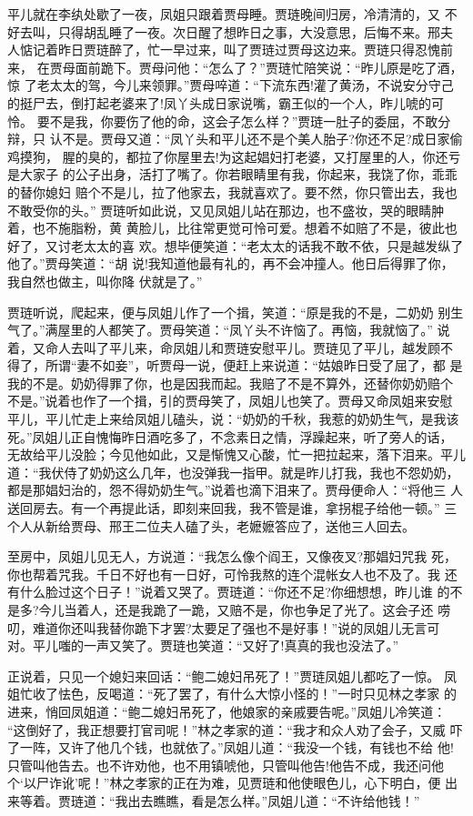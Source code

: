 平儿就在李纨处歇了一夜，凤姐只跟着贾母睡。贾琏晚间归房，冷清清的，又
不好去叫，只得胡乱睡了一夜。次日醒了想昨日之事，大没意思，后悔不来。邢夫
人惦记着昨日贾琏醉了，忙一早过来，叫了贾琏过贾母这边来。贾琏只得忍愧前来，
在贾母面前跪下。贾母问他：“怎么了？”贾琏忙陪笑说：“昨儿原是吃了酒，惊
了老太太的驾，今儿来领罪。”贾母啐道：“下流东西!灌了黄汤，不说安分守己
的挺尸去，倒打起老婆来了!凤丫头成日家说嘴，霸王似的一个人，昨儿唬的可怜。
要不是我，你要伤了他的命，这会子怎么样？”贾琏一肚子的委屈，不敢分辩，只
认不是。贾母又道：“凤丫头和平儿还不是个美人胎子?你还不足?成日家偷鸡摸狗，
腥的臭的，都拉了你屋里去!为这起娼妇打老婆，又打屋里的人，你还亏是大家子
的公子出身，活打了嘴了。你若眼睛里有我，你起来，我饶了你，乖乖的替你媳妇
赔个不是儿，拉了他家去，我就喜欢了。要不然，你只管出去，我也不敢受你的头。”
贾琏听如此说，又见凤姐儿站在那边，也不盛妆，哭的眼睛肿着，也不施脂粉，黄
黄脸儿，比往常更觉可怜可爱。想着不如赔了不是，彼此也好了，又讨老太太的喜
欢。想毕便笑道：“老太太的话我不敢不依，只是越发纵了他了。”贾母笑道：“胡
说!我知道他最有礼的，再不会冲撞人。他日后得罪了你，我自然也做主，叫你降
伏就是了。”

贾琏听说，爬起来，便与凤姐儿作了一个揖，笑道：“原是我的不是，二奶奶
别生气了。”满屋里的人都笑了。贾母笑道：“凤丫头不许恼了。再恼，我就恼了。”
说着，又命人去叫了平儿来，命凤姐儿和贾琏安慰平儿。贾琏见了平儿，越发顾不
得了，所谓“妻不如妾”，听贾母一说，便赶上来说道：“姑娘昨日受了屈了，都
是我的不是。奶奶得罪了你，也是因我而起。我赔了不是不算外，还替你奶奶赔个
不是。”说着也作了一个揖，引的贾母笑了，凤姐儿也笑了。贾母又命凤姐来安慰
平儿，平儿忙走上来给凤姐儿磕头，说：“奶奶的千秋，我惹的奶奶生气，是我该
死。”凤姐儿正自愧悔昨日酒吃多了，不念素日之情，浮躁起来，听了旁人的话，
无故给平儿没脸；今见他如此，又是惭愧又心酸，忙一把拉起来，落下泪来。平儿
道：“我伏侍了奶奶这么几年，也没弹我一指甲。就是昨儿打我，我也不怨奶奶，
都是那娼妇治的，怨不得奶奶生气。”说着也滴下泪来了。贾母便命人：“将他三
人送回房去。有一个再提此话，即刻来回我，我不管是谁，拿拐棍子给他一顿。”
三个人从新给贾母、邢王二位夫人磕了头，老嬷嬷答应了，送他三人回去。

至房中，凤姐儿见无人，方说道：“我怎么像个阎王，又像夜叉?那娼妇咒我
死，你也帮着咒我。千日不好也有一日好，可怜我熬的连个混帐女人也不及了。我
还有什么脸过这个日子！”说着又哭了。贾琏道：“你还不足?你细想想，昨儿谁
的不是多?今儿当着人，还是我跪了一跪，又赔不是，你也争足了光了。这会子还
唠叨，难道你还叫我替你跪下才罢?太要足了强也不是好事！”说的凤姐儿无言可
对。平儿嗤的一声又笑了。贾琏也笑道：“又好了!真真的我也没法了。”

正说着，只见一个媳妇来回话：“鲍二媳妇吊死了！”贾琏凤姐儿都吃了一惊。
凤姐忙收了怯色，反喝道：“死了罢了，有什么大惊小怪的！”一时只见林之孝家
的进来，悄回凤姐道：“鲍二媳妇吊死了，他娘家的亲戚要告呢。”凤姐儿冷笑道：
“这倒好了，我正想要打官司呢！”林之孝家的道：“我才和众人劝了会子，又威
吓了一阵，又许了他几个钱，也就依了。”凤姐儿道：“我没一个钱，有钱也不给
他!只管叫他告去。也不许劝他，也不用镇唬他，只管叫他告!他告不成，我还问他
个‘以尸诈讹’呢！”林之孝家的正在为难，见贾琏和他使眼色儿，心下明白，便
出来等着。贾琏道：“我出去瞧瞧，看是怎么样。”凤姐儿道：“不许给他钱！”

